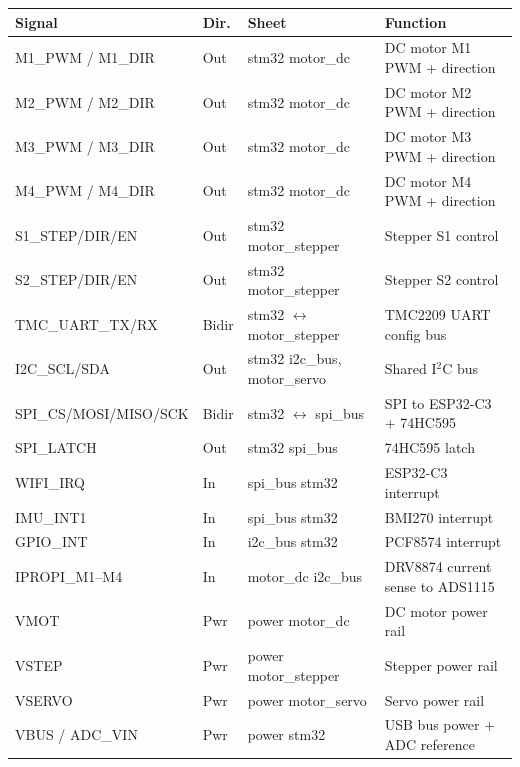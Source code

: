 \documentclass[11pt,a4paper]{article}
\begin{document}
\begin{longtable}{p{3.5cm} p{2cm} p{3cm} p{6cm}}
  \toprule
  \rowcolor{headergray}\color{white}\textbf{Signal} &
  \color{white}\textbf{Dir.} &
  \color{white}\textbf{Sheet} &
  \color{white}\textbf{Function} \\
  \midrule\endhead
  M1\_PWM / M1\_DIR & Out & stm32 \textrightarrow{} motor\_dc & DC motor M1 PWM + direction \\
  M2\_PWM / M2\_DIR & Out & stm32 \textrightarrow{} motor\_dc & DC motor M2 PWM + direction \\
  M3\_PWM / M3\_DIR & Out & stm32 \textrightarrow{} motor\_dc & DC motor M3 PWM + direction \\
  M4\_PWM / M4\_DIR & Out & stm32 \textrightarrow{} motor\_dc & DC motor M4 PWM + direction \\
  S1\_STEP/DIR/EN   & Out & stm32 \textrightarrow{} motor\_stepper & Stepper S1 control \\
  S2\_STEP/DIR/EN   & Out & stm32 \textrightarrow{} motor\_stepper & Stepper S2 control \\
  TMC\_UART\_TX/RX  & Bidir & stm32 $\leftrightarrow$ motor\_stepper & TMC2209 UART config bus \\
  I2C\_SCL/SDA      & Out & stm32 \textrightarrow{} i2c\_bus, motor\_servo & Shared I$^2$C bus \\
  SPI\_CS/MOSI/MISO/SCK & Bidir & stm32 $\leftrightarrow$ spi\_bus & SPI to ESP32-C3 + 74HC595 \\
  SPI\_LATCH        & Out & stm32 \textrightarrow{} spi\_bus & 74HC595 latch \\
  WIFI\_IRQ         & In  & spi\_bus \textrightarrow{} stm32 & ESP32-C3 interrupt \\
  IMU\_INT1         & In  & spi\_bus \textrightarrow{} stm32 & BMI270 interrupt \\
  GPIO\_INT         & In  & i2c\_bus \textrightarrow{} stm32 & PCF8574 interrupt \\
  IPROPI\_M1--M4    & In  & motor\_dc \textrightarrow{} i2c\_bus & DRV8874 current sense to ADS1115 \\
  VMOT              & Pwr & power \textrightarrow{} motor\_dc & DC motor power rail \\
  VSTEP             & Pwr & power \textrightarrow{} motor\_stepper & Stepper power rail \\
  VSERVO            & Pwr & power \textrightarrow{} motor\_servo & Servo power rail \\
  VBUS / ADC\_VIN   & Pwr & power \textrightarrow{} stm32 & USB bus power + ADC reference \\
  \bottomrule
\end{longtable}
\end{document}
